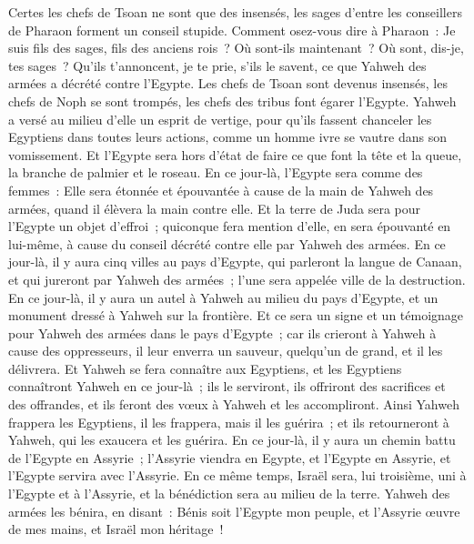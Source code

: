 \begin{multicols}{2}
Certes les chefs de Tsoan ne sont que des insensés, les sages d'entre les conseillers de Pharaon forment un conseil stupide. Comment osez-vous dire à Pharaon~: Je suis fils des sages, fils des anciens rois~?
Où sont-ils maintenant~? Où sont, dis-je, tes sages~? Qu'ils t'annoncent, je te prie, s'ils le savent, ce que Yahweh des armées a décrété contre l'Egypte.
Les chefs de Tsoan sont devenus insensés, les chefs de Noph se sont trompés, les chefs des tribus font égarer l'Egypte.
Yahweh a versé au milieu d'elle un esprit de vertige, pour qu'ils fassent chanceler les Egyptiens dans toutes leurs actions, comme un homme ivre se vautre dans son vomissement.
Et l'Egypte sera hors d'état de faire ce que font la tête et la queue, la branche de palmier et le roseau.
En ce jour-là, l'Egypte sera comme des femmes~: Elle sera étonnée et épouvantée à cause de la main de Yahweh des armées, quand il élèvera la main contre elle.
Et la terre de Juda sera pour l'Egypte un objet d'effroi~; quiconque fera mention d'elle, en sera épouvanté en lui-même, à cause du conseil décrété contre elle par Yahweh des armées.
En ce jour-là, il y aura cinq villes au pays d'Egypte, qui parleront la langue de Canaan, et qui jureront par Yahweh des armées~; l'une sera appelée ville de la destruction.
En ce jour-là, il y aura un autel à Yahweh au milieu du pays d'Egypte, et un monument dressé à Yahweh sur la frontière.
Et ce sera un signe et un témoignage pour Yahweh des armées dans le pays d'Egypte~; car ils crieront à Yahweh à cause des oppresseurs, il leur enverra un sauveur, quelqu'un de grand, et il les délivrera.
Et Yahweh se fera connaître aux Egyptiens, et les Egyptiens connaîtront Yahweh en ce jour-là~; ils le serviront, ils offriront des sacrifices et des offrandes, et ils feront des vœux à Yahweh et les accompliront.
Ainsi Yahweh frappera les Egyptiens, il les frappera, mais il les guérira~; et ils retourneront à Yahweh, qui les exaucera et les guérira.
En ce jour-là, il y aura un chemin battu de l'Egypte en Assyrie~; l'Assyrie viendra en Egypte, et l'Egypte en Assyrie, et l'Egypte servira avec l'Assyrie.
En ce même temps, Israël sera, lui troisième, uni à l'Egypte et à l'Assyrie, et la bénédiction sera au milieu de la terre.
Yahweh des armées les bénira, en disant~: Bénis soit l'Egypte mon peuple, et l'Assyrie œuvre de mes mains, et Israël mon héritage~!

\end{multicols}
